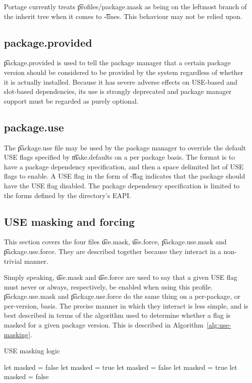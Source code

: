\note Portage currently treats \t{profiles/package.mask} as being on the leftmost branch of the
    inherit tree when it comes to \t{-lines}. This behaviour may not be relied upon.

\subsection{package.provided}
\t{package.provided} is used to tell the package manager that a certain package version should be
considered to be provided by the system regardless of whether it is actually installed. Because it
has severe adverse effects on USE-based and slot-based dependencies, its use is strongly deprecated
and package manager support must be regarded as purely optional.

\subsection{package.use}
The \t{package.use} file may be used by the package manager to override the default USE flags specified
by \t{make.defaults} on a per package basis.  The format is to have a package dependency specification,
and then a space delimited list of USE flags to enable.  A USE flag in the form of \t{-flag} indicates
that the package should have the USE flag disabled.  The package dependency specification is limited to
the forms defined by the directory's EAPI.

\subsection{USE masking and forcing}
\label{sec:use-masking}
This section covers the four files \t{use.mask}, \t{use.force}, \t{package.use.mask} and
\t{package.use.force}. They are described together because they interact in a non-trivial manner.

Simply speaking, \t{use.mask} and \t{use.force} are used to say that a given USE flag must never or
always, respectively, be enabled when using this profile. \t{package.use.mask} and
\t{package.use.force} do the same thing on a per-package, or per-version, basis. The precise manner
in which they interact is less simple, and is best described in terms of the algorithm used to
determine whether a flag is masked for a given package version. This is described in Algorithm~\ref{alg:use-masking}.
\begin{algorithm}
\caption{USE masking logic} \label{alg:use-masking}
\begin{algorithmic}[1]
\STATE let masked = false
        \STATE let masked = true
        \STATE let masked = false
    \ENDIF
            \STATE let masked = true
            \STATE let masked = false
        \ENDIF
    \ENDFOR
\ENDFOR
\end{algorithmic}
\end{algorithm}

